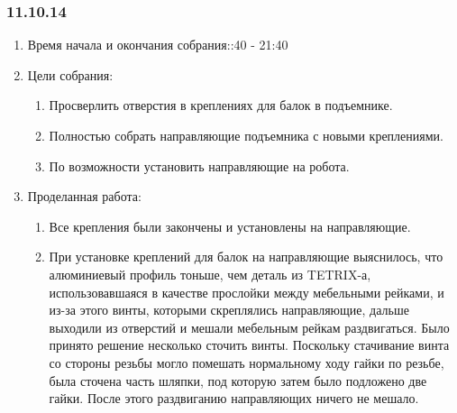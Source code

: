 
\subsubsection{11.10.14}

\begin{enumerate}
	\item Время начала и окончания собрания::40 - 21:40
	\item Цели собрания:\newline
	\begin{enumerate}
	  \item Просверлить отверстия в креплениях для балок в подъемнике.\newline
	  
	  \item Полностью собрать направляющие подъемника с новыми креплениями.\newline
	  
	  \item По возможности установить направляющие на робота.\newline
	  
    \end{enumerate}
	\item Проделанная работа:\newline
	\begin{enumerate}
	  \item Все крепления были закончены и установлены на направляющие.\newline
      
      \item  При установке креплений для балок на направляющие выяснилось, что алюминиевый профиль тоньше, чем деталь из TETRIX-а, использовавшаяся в качестве прослойки между мебельными рейками, и из-за этого винты, которыми скреплялись направляющие, дальше выходили из отверстий и мешали мебельным рейкам раздвигаться. Было принято решение несколько сточить винты. Поскольку стачивание винта со стороны резьбы могло помешать нормальному ходу гайки по резьбе, была сточена часть шляпки, под которую затем было подложено две гайки. После этого раздвиганию направляющих ничего не мешало.\newline
      

\end{enumerate}
\end{enumerate}
